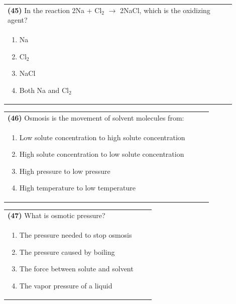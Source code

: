\documentclass{article}
\begin{document}
\noindent\begin{tabular}{|p{0.9\linewidth}|}
\hline
\textbf{(45)} In the reaction 2Na + Cl$_2$ $\rightarrow$ 2NaCl, which is the oxidizing agent?\\[0.2cm]
\begin{minipage}[t]{0.85\linewidth}
\begin{enumerate}[label=\alph*.]
\item Na
\item Cl$_2$
\item NaCl
\item Both Na and Cl$_2$
\end{enumerate}
\end{minipage}\\[0.2cm]
\hline
\end{tabular}

\noindent\begin{tabular}{|p{0.9\linewidth}|}
\hline
\textbf{(46)} Osmosis is the movement of solvent molecules from:\\[0.2cm]
\begin{minipage}[t]{0.85\linewidth}
\begin{enumerate}[label=\alph*.]
\item Low solute concentration to high solute concentration
\item High solute concentration to low solute concentration
\item High pressure to low pressure
\item High temperature to low temperature
\end{enumerate}
\end{minipage}\\[0.2cm]
\hline
\end{tabular}

\noindent\begin{tabular}{|p{0.9\linewidth}|}
\hline
\textbf{(47)} What is osmotic pressure?\\[0.2cm]
\begin{minipage}[t]{0.85\linewidth}
\begin{enumerate}[label=\alph*.]
\item The pressure needed to stop osmosis
\item The pressure caused by boiling
\item The force between solute and solvent
\item The vapor pressure of a liquid
\end{enumerate}
\end{minipage}\\[0.2cm]
\hline
\end{tabular}
\end{document}
